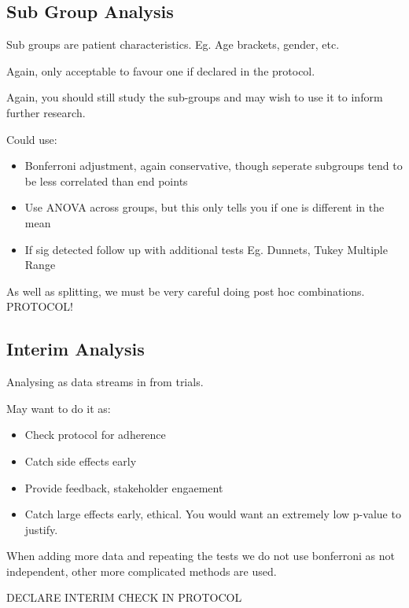 \documentclass[
  letterpaper,
  DIV=11,
  numbers=noendperiod]{scrreprt}
\providecommand{\tightlist}{%
  \setlength{\itemsep}{0pt}\setlength{\parskip}{0pt}}\usepackage{longtable,booktabs,array}
\begin{document}
\hypertarget{sub-group-analysis}{%
\subsection{Sub Group Analysis}\label{sub-group-analysis}}

Sub groups are patient characteristics. Eg. Age brackets, gender, etc.

Again, only acceptable to favour one if declared in the protocol.

Again, you should still study the sub-groups and may wish to use it to
inform further research.

Could use:

\begin{itemize}
\tightlist
\item
  Bonferroni adjustment, again conservative, though seperate subgroups
  tend to be less correlated than end points
\item
  Use ANOVA across groups, but this only tells you if one is different
  in the mean
\item
  If sig detected follow up with additional tests Eg. Dunnets, Tukey
  Multiple Range
\end{itemize}

As well as splitting, we must be very careful doing post hoc
combinations. PROTOCOL!

\hypertarget{interim-analysis}{%
\subsection{Interim Analysis}\label{interim-analysis}}

Analysing as data streams in from trials.

May want to do it as:

\begin{itemize}
\tightlist
\item
  Check protocol for adherence
\item
  Catch side effects early
\item
  Provide feedback, stakeholder engaement
\item
  Catch large effects early, ethical. You would want an extremely low
  p-value to justify.
\end{itemize}

When adding more data and repeating the tests we do not use bonferroni
as not independent, other more complicated methods are used.

DECLARE INTERIM CHECK IN PROTOCOL
\end{document}
